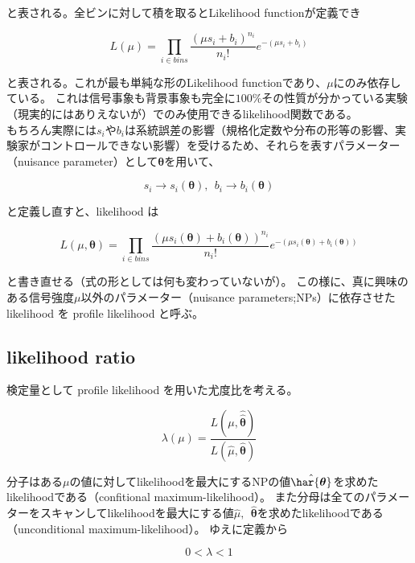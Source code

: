 \documentclass[a4paper,uplatex]{jsreport}
\begin{document}
\begin{euation}
\begin{euation}
\begin{euation}
\begin{euation}
と表される。全ビンに対して積を取るとLikelihood functionが定義でき

\begin{equation}
L(\mu)=\prod_{i\in bins} \frac{(\mu s_i+b_i)^{n_i}}{n_i!}e^{-(\mu s_i+b_i)}
\end{equation}

と表される。これが最も単純な形のLikelihood functionであり、$\mu$にのみ依存している。
これは信号事象も背景事象も完全に$100\%$その性質が分かっている実験（現実的にはありえないが）でのみ使用できるlikelihood関数である。\\

もちろん実際には$s_i$や$b_i$は系統誤差の影響（規格化定数や分布の形等の影響、実験家がコントロールできない影響）を受けるため、それらを表すパラメーター（nuisance parameter）として$\bm{\theta}$を用いて、

\begin{equation}
s_i \to s_i(\bm{\theta}),~~b_i\to b_i(\bm{\theta})
\end{equation}

と定義し直すと、likelihood は

\begin{equation}
L(\mu,\bm{\theta})=\prod_{i\in bins} \frac{(\mu s_i(\bm{\theta})+b_i(\bm{\theta}))^{n_i}}{n_i!}e^{-(\mu s_i(\bm{\theta})+b_i(\bm{\theta}))}
\end{equation}

と書き直せる（式の形としては何も変わっていないが）。
この様に、真に興味のある信号強度$\mu$以外のパラメーター（nuisance parameters;NPs）に依存させた likelihood を profile likelihood と呼ぶ。

\subsection{likelihood ratio}
検定量として profile likelihood を用いた尤度比を考える。

\begin{equation}
\lambda(\mu)=\frac{L(\mu,\hat{\hat{\bm{\theta}}})}{L(\hat{\mu},\hat{\bm{\theta}})}
\end{equation}

分子はある$\mu$の値に対してlikelihoodを最大にするNPの値$\hat{\har{\bm{\theta}}}$を求めたlikelihoodである（confitional maximum-likelihood）。
また分母は全てのパラメーターをスキャンしてlikelihoodを最大にする値$\hat{\mu},~~\hat{\bm{\theta}}$を求めたlikelihoodである（unconditional maximum-likelihood）。
ゆえに定義から

\begin{equation}
0 < \lambda < 1
\end{equation}


\end{euation}
\end{euation}
\end{euation}
\end{euation}
\end{document}
